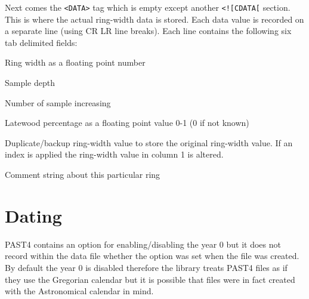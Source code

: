 Next comes the \verb|<DATA>| tag which is empty except another \verb|<![CDATA[| section. This is where the actual ring-width data is stored. Each data value is recorded on a separate line (using CR LR line breaks). Each line contains the following six tab delimited fields:

\begin{itemize*}
    \item  Ring width as a floating point number
    \item  Sample depth
    \item  Number of sample increasing
    \item  Latewood percentage as a floating point value 0-1 (0 if not known)
    \item  Duplicate/backup ring-width value to store the original ring-width value. If an index is applied the ring-width value in column 1 is altered.
    \item  Comment string about this particular ring 
\end{itemize*}

\section{Dating}

PAST4 contains an option for enabling/disabling the year 0 but it does not record within the data file whether the option was set when the file was created. By default the year 0 is disabled therefore the library treats PAST4 files as if they use the Gregorian calendar but it is possible that files were in fact created with the Astronomical calendar in mind. 

\newpage
